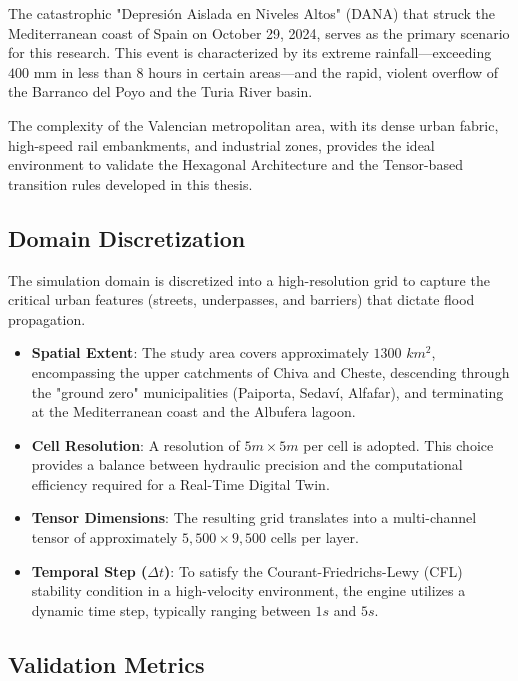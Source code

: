 The catastrophic "Depresión Aislada en Niveles Altos" (DANA) that struck the Mediterranean coast of Spain on October 29, 2024, serves 
as the primary scenario for this research. This event is characterized by its extreme rainfall—exceeding $400$ mm in less than 8 hours 
in certain areas—and the rapid, violent overflow of the Barranco del Poyo and the Turia River basin.

The complexity of the Valencian metropolitan area, with its dense urban fabric, high-speed rail embankments, and industrial zones, 
provides the ideal environment to validate the Hexagonal Architecture and the Tensor-based transition rules developed in this thesis.


\subsection{Domain Discretization}

The simulation domain is discretized into a high-resolution grid to capture the critical urban features (streets, underpasses, and 
barriers) that dictate flood propagation.

\begin{itemize}
    \item \textbf{Spatial Extent}: The study area covers approximately $1300$ $km^2$, encompassing the upper catchments of Chiva and Cheste, descending through the "ground zero" municipalities (Paiporta, Sedaví, Alfafar), and terminating at the Mediterranean coast and the Albufera lagoon.

    \item \textbf{Cell Resolution}: A resolution of $5m \times 5m$ per cell is adopted. This choice provides a balance between hydraulic precision and the computational efficiency required for a Real-Time Digital Twin.

    \item \textbf{Tensor Dimensions}: The resulting grid translates into a multi-channel tensor of approximately $5,500 \times 9,500$ cells per layer.

    \item \textbf{Temporal Step ($\Delta t$)}: To satisfy the Courant-Friedrichs-Lewy (CFL) stability condition in a high-velocity environment, the engine utilizes a dynamic time step, typically ranging between $1s$ and $5s$.
\end{itemize}


\subsection{Validation Metrics}

